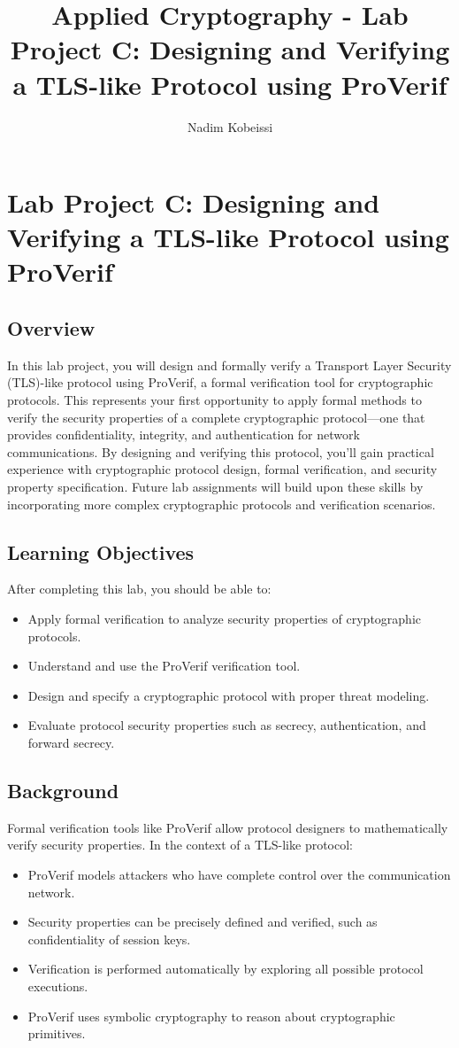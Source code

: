 \documentclass[10pt,a4paper,american]{exam}
\title{Applied Cryptography - Lab Project C: Designing and Verifying a TLS-like Protocol using ProVerif}
\author{Nadim Kobeissi}
\begin{document}
\classhandoutheader
\section*{Lab Project C: Designing and Verifying a TLS-like Protocol using ProVerif}

\subsection*{Overview}
In this lab project, you will design and formally verify a Transport Layer Security (TLS)-like protocol using ProVerif, a formal verification tool for cryptographic protocols. This represents your first opportunity to apply formal methods to verify the security properties of a complete cryptographic protocol—one that provides confidentiality, integrity, and authentication for network communications. By designing and verifying this protocol, you'll gain practical experience with cryptographic protocol design, formal verification, and security property specification. Future lab assignments will build upon these skills by incorporating more complex cryptographic protocols and verification scenarios.

\subsection*{Learning Objectives}
After completing this lab, you should be able to:
\begin{itemize}
	\item Apply formal verification to analyze security properties of cryptographic protocols.
	\item Understand and use the ProVerif verification tool.
	\item Design and specify a cryptographic protocol with proper threat modeling.
	\item Evaluate protocol security properties such as secrecy, authentication, and forward secrecy.
\end{itemize}

\subsection*{Background}
Formal verification tools like ProVerif allow protocol designers to mathematically verify security properties. In the context of a TLS-like protocol:
\begin{itemize}
	\item ProVerif models attackers who have complete control over the communication network.
	\item Security properties can be precisely defined and verified, such as confidentiality of session keys.
	\item Verification is performed automatically by exploring all possible protocol executions.
	\item ProVerif uses symbolic cryptography to reason about cryptographic primitives.
\end{itemize}
\end{document}
